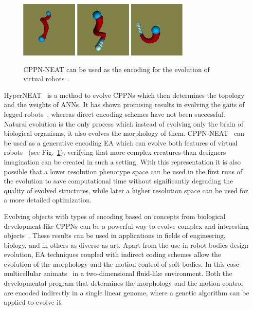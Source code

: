 \begin{figure}[b!]
\centering
\includegraphics[width=0.25\textwidth,height=0.2\textwidth]{../Figures/Misc/auerbach1.png}
\includegraphics[width=0.25\textwidth,height=0.2\textwidth]{../Figures/Misc/auerbach2.png}
\includegraphics[width=0.25\textwidth,height=0.2\textwidth]{../Figures/Misc/auerbach3.png}
\caption{CPPN-NEAT can be used as the encoding for the evolution of virtual robots~\citep{auerbach2010dynamic}.}
\label{fig:auerbach}
\end{figure}

HyperNEAT~\citep{stanley2009hypercube} is a method to evolve CPPNs which then determines the topology and the weights of ANNs. It has shown promising results in evolving the gaits of legged robots~\citep{clune2009evolving}, whereas direct encoding schemes have not been successful. Natural evolution is the only process which instead of evolving only the brain of biological organisms, it also evolves the morphology of them. CPPN-NEAT~\citep{stanley2007compositional} can be used as a generative encoding EA which can evolve both features of virtual robots~\citep{auerbach2010dynamic, auerbach2010evolving} (see Fig.~\ref{fig:auerbach}), verifying that more complex creatures than designers imagination can be created in such a setting. With this representation it is also possible that a lower resolution phenotype space can be used in the first runs of the evolution to save computational time without significantly degrading the quality of evolved structures, while later a higher resolution space can be used for a more detailed optimization.

Evolving objects with types of encoding based on concepts from biological development like CPPNs can be a powerful way to evolve complex and interesting objects~\citep{clune2011evolving}. These results can be used in applications in fields of engineering, biology, and in others as diverse as art. Apart from the use in robot-bodies design evolution, EA techniques coupled with indirect coding schemes allow the evolution of the morphology and the motion control of soft bodies. In this case multicellular animats~\citep{joachimczak2012co} in a two-dimensional fluid-like environment. Both the developmental program that determines the morphology and the motion control are encoded indirectly in a single linear genome, where a genetic algorithm can be applied to evolve it.

